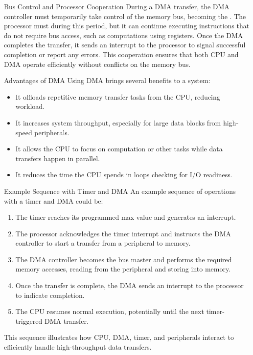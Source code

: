 \begin{parag}{Bus Control and Processor Cooperation}
    During a DMA transfer, the DMA controller must temporarily take control of the memory bus, becoming the . The processor must  during this period, but it can continue executing instructions that do not require bus access, such as computations using registers. Once the DMA completes the transfer, it sends an interrupt to the processor to signal successful completion or report any errors. This cooperation ensures that both CPU and DMA operate efficiently without conflicts on the memory bus.
\end{parag}

\begin{parag}{Advantages of DMA}
    Using DMA brings several benefits to a system:
    \begin{itemize}
        \item It offloads repetitive memory transfer tasks from the CPU, reducing workload.
        \item It increases system throughput, especially for large data blocks from high-speed peripherals.
        \item It allows the CPU to focus on computation or other tasks while data transfers happen in parallel.
        \item It reduces the time the CPU spends in  loops checking for I/O readiness.
    \end{itemize}
\end{parag}

\begin{parag}{Example Sequence with Timer and DMA}
    An example sequence of operations with a timer and DMA could be:
    \begin{enumerate}
        \item The timer reaches its programmed max value and generates an interrupt.
        \item The processor acknowledges the timer interrupt and instructs the DMA controller to start a transfer from a peripheral to memory.
        \item The DMA controller becomes the bus master and performs the required memory accesses, reading from the peripheral and storing into memory.
        \item Once the transfer is complete, the DMA sends an interrupt to the processor to indicate completion.
        \item The CPU resumes normal execution, potentially until the next timer-triggered DMA transfer.
    \end{enumerate}
    This sequence illustrates how CPU, DMA, timer, and peripherals interact to efficiently handle high-throughput data transfers.
\end{parag}






